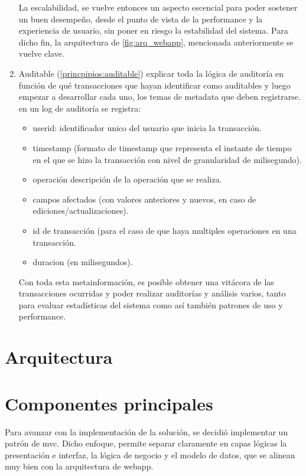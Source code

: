 \begin{enumerate}
    La escalabilidad, se vuelve entonces un aspecto escencial para poder sostener un buen desempeño, desde el punto de vista de la performance y la experiencia de usuario, sin poner en riesgo la estabilidad del sistema. Para dicho fin, la arquitectura de \ref{fig:arq_webapp}, mencionada anteriormente se vuelve clave.
    
    \item Auditable (\ref{princpipios:auditable})
    explicar toda la lógica de auditoría en función de qué transacciones que hayan identificar como auditables y luego empezar a desarrollar cada uno, los temas de metadata que deben registrarse. en un log de auditoría se registra:

    \begin{itemize}
        \item userid: identificador unico del usuario que inicia la transacción.
        \item timestamp (formato de timestamp que representa el instante de tiempo en el que se hizo la transacción con nivel de granularidad de milisegundo).
        \item operación descripción de la operación que se realiza.
        \item campos afectados (con valores anteriores y nuevos, en caso de ediciones/actualizaciones).
        \item id de transacción (para el caso de que haya multiples operaciones en una transacción.
        \item duracion (en milisegundos).
        
    \end{itemize}

    Con toda esta metainformación, es posible obtener una vitácora de las transacciones ocurridas y poder realizar auditorías y análisis varios, tanto para evaluar estadísticas del sistema como así también patrones de uso y performance.
    
\end{enumerate}

\section{Arquitectura}
\section{Componentes principales}

Para avanzar con la implementación de la solución, se decidió implementar un patrón de \gls{mvc}. Dicho enfoque, permite separar claramente en capas lógicas la presentación e interfaz, la lógica de negocio y el modelo de datos, que se alinean muy bien con la arquitectura de webapp.

